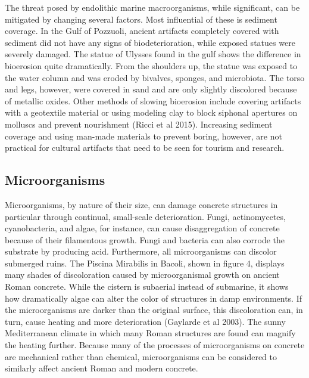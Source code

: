 \documentclass[12pt]{article}
\begin{document}
	The threat posed by endolithic marine macroorganisms, while significant, can be mitigated by changing several factors.  Most influential of these is sediment coverage. In the Gulf of Pozzuoli, ancient artifacts completely covered with sediment did not have any signs of biodeterioration, while exposed statues were severely damaged.  The statue of Ulysses found in the gulf shows the difference in bioerosion quite dramatically. From the shoulders up, the statue was exposed to the water column and was eroded by bivalves, sponges, and microbiota. The torso and legs, however, were covered in sand and are only slightly discolored because of metallic oxides. Other methods of slowing bioerosion include covering artifacts with a geotextile material or using modeling clay to block siphonal apertures on molluscs and prevent nourishment (Ricci et al 2015). Increasing sediment coverage and using man-made materials to prevent boring, however, are not practical for cultural artifacts that need to be seen for tourism and research.  

\subsection*{Microorganisms}

Microorganisms, by nature of their size, can damage concrete structures in particular through continual, small-scale deterioration.  Fungi, actinomycetes, cyanobacteria, and algae, for instance, can cause disaggregation of concrete because of their filamentous growth.  Fungi and bacteria can also corrode the substrate by producing acid.  Furthermore, all microorganisms can discolor submerged ruins.  The Piscina Mirabilis in Bacoli, shown in figure 4, displays many shades of discoloration caused by microorganismal growth on ancient Roman concrete.  While the cistern is subaerial instead of submarine, it shows how dramatically algae can alter the color of structures in damp environments. If the microorganisms are darker than the original surface, this discoloration can, in turn, cause heating and more deterioration (Gaylarde et al 2003).  The sunny Mediterranean climate in which many Roman structures are found can magnify the heating further.  Because many of the processes of microorganisms on concrete are mechanical rather than chemical, microorganisms can be considered to similarly affect ancient Roman and modern concrete.
\end{document}
